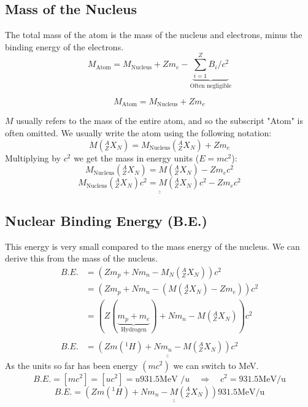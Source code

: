\documentclass{article}
\begin{document}
\subsection{Mass of the Nucleus}
The total mass of the atom is the mass of the nucleus and electrons, minus the binding energy of the electrons. 
\begin{equation}
M_{\text{Atom}} = M_{\text{Nucleus}} + Zm_e - \underbrace{∑_{i=1}^{Z} B_i / c^2}_{\text{Often negligible}}
\end{equation}

\begin{equation}
M_{\text{Atom}} = M_{\text{Nucleus}} + Zm_e
\end{equation}

$M$ usually refers to the mass of the entire atom, and so the subscript "Atom" is often omitted. We usually write the atom using the following notation:
\begin{equation}
M\left(_{Z}^{A}X_{N}\right) = M_{\text{Nucleus}} \left(_{Z}^{A}X_{N}\right) + Zm_e
\end{equation}
Multiplying by $c^2$ we get the mass in energy units ($E = mc^2$):
\begin{equation}
M_{\text{Nucleus}}\left(_{Z}^{A}X_{N}\right) = M\left(_{Z}^{A}X_{N}\right) - Zm_ec^2
\end{equation}
\begin{equation}
\underline{\underline{M_{\text{Nucleus}}\left(_{Z}^{A}X_{N}\right)c^2 = M\left(_{Z}^{A}X_{N}\right)c^2 - Zm_e c^2 
}}
\end{equation}
\subsection{Nuclear Binding Energy (B.E.)}
This energy is very small compared to the mass energy of the nucleus. We can derive this from the mass of the nucleus. 
\begin{align}
    B.E. &= \left(Zm_{p} + Nm_{n} - M_{N}\left(_{Z}^{A}X_{N}\right)\right) c^2 \\
    &= \left(Zm_{p} + Nm_{n} - \left(M\left(_{Z}^{A}X_{N}\right) - Zm_e\right)\right) c^2 \\ 
    &= \left(Z(\underbrace{m_{p} + m_e}_{\text{Hydrogen}}) + Nm_{n} - M\left(_{Z}^{A}X_{N}\right)\right) c^2 \\ \\
   B.E. &= \underline{\underline{\left(Zm\left(^{1}H\right) + Nm_{n} - M\left(_{Z}^{A}X_{N}\right)\right) c^2}}
\end{align}
As the units so far has been energy $(mc^2)$ we can switch to MeV. 
\begin{equation}
B.E. = \left[mc^2\right] = \left[uc^2\right] = u931.5\text{MeV /}u \quad ⇒ \quad c^2 = 931.5 \text{MeV/u}
\end{equation}
\begin{equation}\label{eq: binding_energy}
B.E. = \underline{\underline{\left(Zm\left(^{1}H\right) + Nm_{n} - M\left(_{Z}^{A}X_{N}\right)\right) 931.5 \text{MeV/u}}}
\end{equation}
\end{document}
